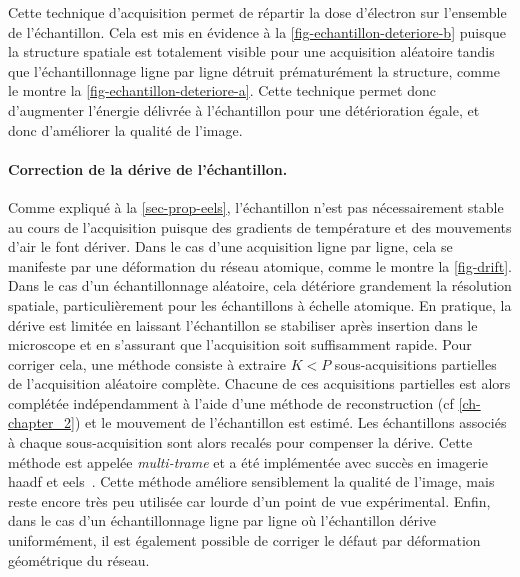     Cette technique d'acquisition permet de répartir la dose d'électron sur l'ensemble de l'échantillon. Cela est mis en évidence à la \cref{fig-echantillon-deteriore-b} puisque la structure spatiale est totalement visible pour une acquisition aléatoire tandis que l'échantillonnage ligne par ligne  détruit prématurément la structure, comme le montre la \cref{fig-echantillon-deteriore-a}. Cette technique permet donc d'augmenter l'énergie délivrée à l'échantillon pour une détérioration égale, et donc d'améliorer la qualité de l'image.
    
    
    \paragraph{Correction de la dérive de l'échantillon.} Comme expliqué à la \cref{sec-prop-eels}, l'échantillon n'est pas nécessairement stable au cours de l'acquisition puisque des gradients de température et des mouvements d'air le font dériver. Dans le cas d'une acquisition ligne par ligne, cela se manifeste par une déformation du réseau atomique, comme le montre la \cref{fig-drift}. Dans le cas d'un échantillonnage aléatoire, cela détériore grandement la résolution spatiale, particulièrement pour les échantillons à échelle atomique. 
    En pratique, la dérive est limitée en laissant l'échantillon se stabiliser après insertion dans le microscope et en s'assurant que l'acquisition soit suffisamment rapide.
    Pour corriger cela, une méthode consiste à extraire $K<P$ sous-acquisitions partielles de l'acquisition aléatoire complète. Chacune de ces acquisitions partielles est alors complétée indépendamment à l'aide d'une méthode de reconstruction (cf \cref{ch-chapter_2}) et le mouvement de l'échantillon est estimé. Les échantillons associés à chaque sous-acquisition sont alors recalés pour compenser la dérive. Cette méthode est appelée \emph{multi-trame} et a été implémentée avec succès en imagerie \gls{haadf} et \gls{eels}~\cite{zobelli2019spatial}. Cette méthode améliore sensiblement la qualité de l'image, mais reste encore très peu utilisée car lourde d'un point de vue expérimental. Enfin, dans le cas d'un échantillonnage ligne par ligne où l'échantillon dérive uniformément, il est également possible de corriger le défaut par déformation géométrique du réseau.

